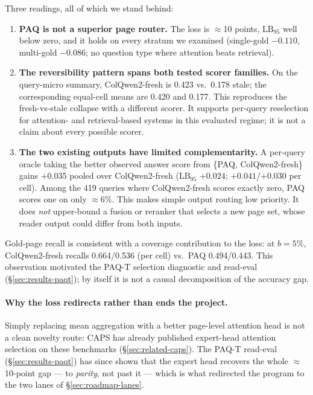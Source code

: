 \documentclass[11pt,letterpaper]{article}
\newcommand{\paq}{\textsc{PAQ}}
\newcommand{\paqt}{\textsc{PAQ-T}}
\newcommand{\lb}{\mathrm{LB}_{95}}
\begin{document}
Three readings, all of which we stand behind:
\begin{enumerate}
  \item \textbf{\paq{} is not a superior page router.} The loss is $\approx$10 points, $\lb$
        well below zero, and it holds on every stratum we examined (single-gold $-0.110$,
        multi-gold $-0.086$; no question type where attention beats retrieval).
  \item \textbf{The reversibility pattern spans both tested scorer families.} On the
        query-micro summary, ColQwen2-fresh is 0.423 vs.\ 0.178 stale; the corresponding
        equal-cell means are 0.420 and 0.177. This reproduces the fresh-vs-stale collapse with a
        different scorer. It supports per-query reselection for attention- and retrieval-based
        systems in this evaluated regime; it is not a claim about every possible scorer.
  \item \textbf{The two existing outputs have limited complementarity.} A per-query oracle taking
        the better observed answer score from \{\paq{}, ColQwen2-fresh\} gains $+0.035$ pooled
        over ColQwen2-fresh ($\lb$ $+0.024$; $+0.041$/$+0.030$ per cell). Among the 419 queries
        where ColQwen2-fresh scores exactly zero, \paq{} scores one on only $\approx$6\%.
        This makes simple output routing low priority. It does \emph{not} upper-bound a fusion or
        reranker that selects a new page set, whose reader output could differ from both inputs.
\end{enumerate}

Gold-page recall is consistent with a coverage contribution to the loss: at $b=5\%$,
ColQwen2-fresh recalls 0.664/0.536 (per cell) vs.\ \paq{} 0.494/0.443. This observation motivated
the \paqt{} selection diagnostic and read-eval (\S\ref{sec:results-paqt}); by itself it is not a
causal decomposition of the accuracy gap.

\paragraph{Why the loss redirects rather than ends the project.} Simply replacing mean
aggregation with a better page-level attention head is not a clean novelty route: CAPS has already
published expert-head attention selection on these benchmarks (\S\ref{sec:related-caps}). The
\paqt{} read-eval (\S\ref{sec:results-paqt}) has since shown that the expert head recovers the
whole $\approx$10-point gap --- to \emph{parity}, not past it --- which is what redirected the
program to the two lanes of \S\ref{sec:roadmap-lanes}.
\end{document}
